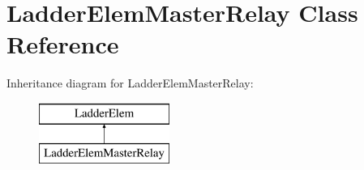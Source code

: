 \hypertarget{class_ladder_elem_master_relay}{\section{Ladder\-Elem\-Master\-Relay Class Reference}
\label{class_ladder_elem_master_relay}
}
Inheritance diagram for Ladder\-Elem\-Master\-Relay\-:\begin{figure}[H]
\begin{center}
\leavevmode
\includegraphics[height=2.000000cm]{class_ladder_elem_master_relay}
\end{center}
\end{figure}
